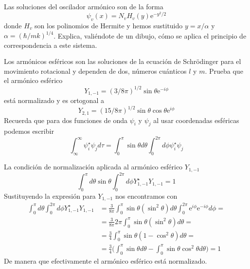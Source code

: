\documentclass[addpoints,spanish, 12pt,a4paper]{exam}
\begin{document}
\begin{questions}
    \question[2] Las soluciones del oscilador armónico
    son de la forma
    \begin{equation*}
        \psi_v(x) = N_vH_v(y)\mathrm{e}^{-y^2/2}    
    \end{equation*}
    donde $H_v$ son los polinomios de Hermite y 
    hemos sustituido $y=x/\alpha$ y 
    $\alpha=(\hbar/mk)^{1/4}$. Explica, valiéndote de un
    dibujo, cómo se aplica el principio de correspondencia
    a este sistema.
    \begin{solution}
        \vspace*{29\baselineskip}
    \end{solution}
    
    \question[1\half] Los armónicos esféricos son las soluciones
    de la ecuación de Schrödinger para el movimiento
    rotacional y dependen de dos, números cuánticos $l$ y 
    $m$. Prueba que el armónico esférico
    \begin{equation*}
        Y_{1,-1}=(3/8\pi)^{1/2}\sin\theta\mathrm{e}^{-i\phi}
     \end{equation*}
    está normalizado y es ortogonal a    
    \begin{equation*}
        Y_{2,1}=(15/8\pi)^{1/2}\sin\theta\cos\theta\mathrm{e}^{i\phi}
    \end{equation*}
    Recuerda que para dos funciones de onda $\psi_i$ y $\psi_j$ al usar coordenadas esféricas podemos 
    escribir
    \begin{equation*}
        \int_\infty^\infty\psi_i^\star\psi_j d\tau=
    \int_0^\pi \sin\theta d\theta\int_0^{2\pi}d\phi\psi_i^\star\psi_j
    \end{equation*}

    \begin{solution}
    \selectfont
    La condición de normalización aplicada al armónico esférico $Y_{1,-1}$
    \begin{equation*}
        \int_0^\pi d\theta\sin\theta\int_0^{2\pi}d\phi Y_{1,-1}^{\star}Y_{1,-1}=1
    \end{equation*}
    Sustituyendo la expresión para $Y_{1,-1}$ nos 
    encontramos con
    \begin{align*}
        \int_0^\pi d\theta\int_0^{2\pi}d\phi Y_{1,-1}^{\star}Y_{1,-1}&=
        \frac{3}{8\pi}\int_0^\pi \sin\theta(\sin^2\theta) d\theta\int_0^{2\pi}\mathrm{e}^{i\phi}\mathrm{e}^{-i\phi}d\phi =\\
        &=\frac{3}{8\pi}2\pi\int_0^\pi \sin\theta(\sin^2\theta) d\theta=\\
        &=\frac{3}{4}\int_0^\pi \sin\theta(1-\cos^2\theta) d\theta=\\
       &=\frac{3}{4}\bigg(\int_0^\pi \sin\theta d\theta -\int_0^\pi \sin\theta\cos^2\theta d\theta\bigg)=1
    \end{align*}
    De manera que efectivamente el armónico esférico está 
    normalizado.
    

\end{solution}
\end{questions}
\end{document}
